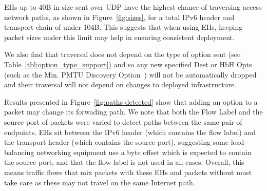 \documentclass[conference]{IEEEtran}
\begin{document}

EHs up to 40B in size sent over UDP have the highest chance of traversing access network paths, as shown in Figure~\ref{fig:sizes}, for a total IPv6 header and transport chain of under 104B. This suggests that when using EHs, keeping packet sizes under this limit may help in ensuring consistent deployment.


We also find that traversal does not depend on the type of option sent (see Table~\ref{tbl:option_type_support}) and so any new specified Dest or HbH Opts (such as the Min. PMTU Discovery Option~\cite{rfc9268}) will not be automatically dropped and their traversal will not depend on changes to deployed infrastructure.



Results presented in Figure~\ref{fig:paths-detected} show that adding an option to a packet may change its forwading path. We note that both the Flow Label and the source port of packets were varied to detect paths between the same pair of endpoints. EHs sit between the IPv6 header (which contains the flow label) and the transport header (which contains the source port), suggesting some load-balancing networking equipment use a byte offset which is expected to contain the source port, and that the flow label is not used in all cases. Overall, this means traffic flows that mix packets with these EHs and packets without must take care as these may not travel on the same Internet path.
\end{document}

